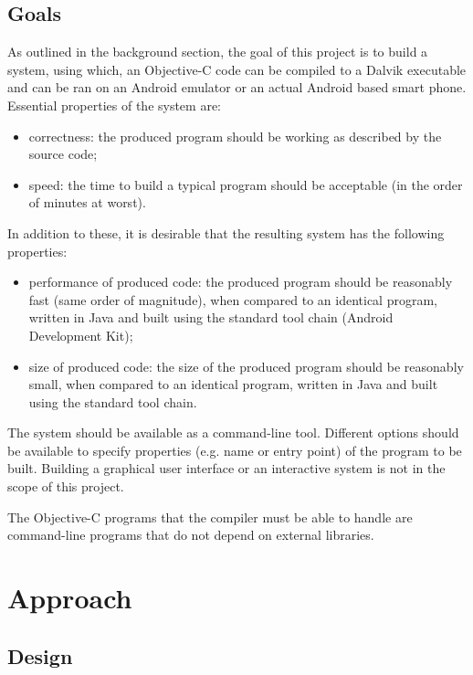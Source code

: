 \documentclass[parskip]{cs4rep}
\begin{document}
\section{Goals}

As outlined in the background section, the goal of this project is to build a system, using which, an Objective-C code can be compiled to a Dalvik executable and can be ran on an Android emulator or an actual Android based smart phone. Essential properties of the system are:
\begin{itemize}
\item
correctness: the produced program should be working as described by the source code;
\item
speed: the time to build a typical program should be acceptable (in the order of minutes at worst).
\end{itemize}

In addition to these, it is desirable that the resulting system has the following properties:

\begin{itemize}
\item
performance of produced code: the produced program should be reasonably fast (same order of magnitude), when compared to an identical program, written in Java and built using the standard tool chain (Android Development Kit);
\item
size of produced code: the size of the produced program should be reasonably small, when compared to an identical program, written in Java and built using the standard tool chain.
\end{itemize}

The system should be available as a command-line tool. Different options should be available to specify properties (e.g. name or entry point) of the program to be built. Building a graphical user interface or an interactive system is not in the scope of this project.

The Objective-C programs that the compiler must be able to handle are command-line programs that do not depend on external libraries.

\chapter{Approach}

\section{Design}
\end{document}
